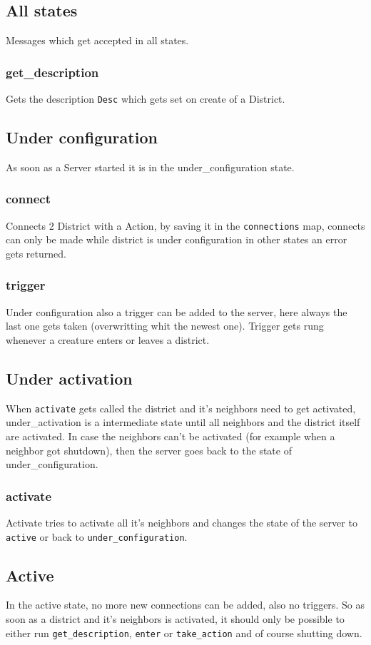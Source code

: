 \documentclass[12pt,a4paper]{article}
\begin{document}
\subsection{All states}
Messages which get accepted in all states.
\subsubsection{get\_description}
Gets the description \texttt{Desc} which gets set on create of a District.

\subsection{Under configuration}
As soon as a Server started it is in the under\_configuration state.
\subsubsection{connect}
Connects 2 District with a Action, by saving it in the \texttt{connections} map, 
connects can only be made while district is under configuration in other states an error gets returned.

\subsubsection{trigger}
Under configuration also a trigger can be added to the server, here always the last one gets taken (overwritting whit the newest one).
Trigger gets rung whenever a creature enters or leaves a district.

\subsection{Under activation}
When \texttt{activate} gets called the district and it's neighbors need to get activated, under\_activation is a intermediate state until all neighbors and the district itself are activated.
In case the neighbors can't be activated (for example when a neighbor got shutdown), then the server goes back to the state of under\_configuration.

\subsubsection{activate}
Activate tries to activate all it's neighbors and changes the state of the server to \texttt{active} or back to \texttt{under\_configuration}.

\subsection{Active}
In the active state, no more new connections can be added, also no triggers.
So as soon as a district and it's neighbors is activated, it should only be possible to either run \texttt{get\_description}, \texttt{enter} or \texttt{take\_action} and of course shutting down.
\end{document}
